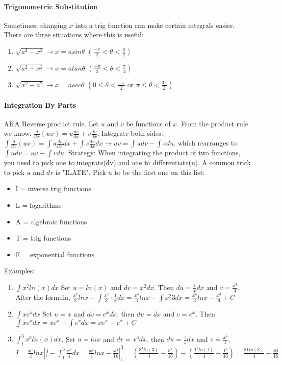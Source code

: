\documentclass[10pt,letter]{article}
\begin{document}
\paragraph{Trigonometric Substitution} Sometimes, changing $x$ into a trig function can make certain integrals easier. There are three situations where this is useful: \begin{enumerate}
    \item $\sqrt{a^2-x^2}\rightarrow x=asin\theta$ $(\frac{-\pi}{2}<\theta<\frac{\pi}{2})$
    \item $\sqrt{a^2+x^2}\rightarrow x=atan\theta$ $(\frac{-\pi}{2}<\theta<\frac{\pi}{2})$
    \item $\sqrt{x^2-a^2}\rightarrow x=asec\theta$ $(0\leq\theta<\frac{-\pi}{2} \text{ or }\pi\leq\theta<\frac{3\pi}{2})$
\end{enumerate}

\paragraph{Integration By Parts} AKA Reverse product rule. Let $u$ and $v$ be functions of $x$. From the product rule we know: $\frac{d}{dx}(ux)=u\frac{dv}{dx}+v\frac{du}{dx}$. Integrate both sides: $\int\frac{d}{dx}(ux)=\int u\frac{dv}{dx}dx+\int v\frac{du}{dx}dx \rightarrow uv=\int udv - \int vdu$, which rearranges to $\int udv = uv-\int vdu$. Strategy: When integrating the product of two functions, you need to pick one to integrate(dv) and one to differentiate(u). A common trick to pick $u$ and $dv$ is "ILATE". Pick $u$ to be the first one on this list: \begin{itemize}
    \item I = inverse trig functions
    \item L = logarithms
    \item A = algebraic functions
    \item T = trig functions
    \item E = exponential functions
\end{itemize}
Examples: 
\begin{enumerate}
    \item $\int x^2ln(x)dx$ Set $u = ln(x)$ and $dv = x^2dx$. Then $du = \frac{1}{x}dx$ and $v = \frac{x^3}{3}$. After the formula, $\frac{x^3}{3}lnx-\int\frac{x^3}{3}\cdot\frac{1}{x}dx=\frac{x^3}{3}lnx-\int{x^2}{3}dx=\frac{x^3}{3}lnx-\frac{x^3}{9}+C$ 
    \item $\int xe^xdx$ Set $u = x$ and $dv = e^xdx$, then $du = dx$ and $v=e^x$. Then $\int xe^xdx = xe^x - \int e^xdx = xe^x  -e^x+C$ 
    \item $\int_1^3 x^3ln(x)dx$. Set $u = lnx$ and $dv = x^3dx$, then $du = \frac{1}{x}dx$ and $v=\frac{x^4}{4}$. $I=\frac{x^4}{4}lnx|_1^3-\int_1^3\frac{x^3}{4}dx = \frac{x^4}{4}lnx-\frac{x^4}{16}|_1^3 = \left(\frac{3^4ln(3)}{4}-\frac{3^4}{16}\right) - \left(\frac{1^4ln(1)}{4} - \frac{1^4}{16}\right) = \frac{81ln(3)}{4}-\frac{80}{16}$
\end{enumerate}
\end{document}
